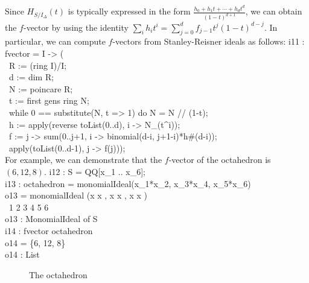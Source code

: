 Since $H_{S/I_{\Delta}}(t)$ is typically expressed in the form
$\frac{h_{0} + h_{1}t + \dotsb + h_{d}t^{d}}{(1-t)^{d+1}}$, we can
obtain the $f$-vector by using the identity $\sum_{i} h_{i}t^{i} =
\sum_{j=0}^{d} f_{j-1}t^{j}(1-t)^{d-j}$.  In particular, we can
compute $f$-vectors from Stanley-Reisner ideals as follows:
\beginOutput
i11 : fvector = I -> (\\
\           R := (ring I)/I;\\
\           d := dim R;\\
\           N := poincare R;\\
\           t := first gens ring N;\\
\           while 0 == substitute(N, t => 1) do N = N // (1-t);\\
\           h := apply(reverse toList(0..d), i -> N_(t^i));\\
\           f := j -> sum(0..j+1, i -> binomial(d-i, j+1-i)*h#(d-i));\\
\           apply(toList(0..d-1), j -> f(j)));\\
\endOutput
For example, we can demonstrate that the $f$-vector of the octahedron
is $(6,12,8)$.
\beginOutput
i12 : S = QQ[x_1 .. x_6];\\
\endOutput
\beginOutput
i13 : octahedron = monomialIdeal(x_1*x_2, x_3*x_4, x_5*x_6)\\
\emptyLine
o13 = monomialIdeal (x x , x x , x x )\\
\                      1 2   3 4   5 6\\
\emptyLine
o13 : MonomialIdeal of S\\
\endOutput
\beginOutput
i14 : fvector octahedron\\
\emptyLine
o14 = \{6, 12, 8\}\\
\emptyLine
o14 : List\\
\endOutput

\begin{figure}
\begin{center}
\epsfysize=1.8in 
\end{center}
\caption{The octahedron}
\end{figure}

